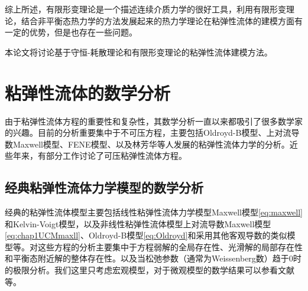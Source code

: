 综上所述，有限形变理论是一个描述连续介质力学的很好工具，利用有限形变理论，结合非平衡态热力学的方法发展起来的热力学理论在粘弹性流体的建模方面有一定的优势，但是也存在一些问题。

本论文将讨论基于守恒-耗散理论和有限形变理论的粘弹性流体建模方法。

\section{粘弹性流体的数学分析}
由于粘弹性流体方程的重要性和复杂性，其数学分析一直以来都吸引了很多数学家的兴趣\cite{lin2012some,li2007mathematical,weinan2002convergence,fabrizio1992mathematical,renardy2008mathematical,joseph1987hyperbolicity,guillope2010regular,saut2012lectures,yong2014newtonian,qian2010well,hu2011global,lei2005global,fang2014incompressible}。目前的分析重要集中于不可压方程，主要包括Oldroyd-B模型、上对流导数Maxwell模型、FENE模型、以及林芳华等人发展的粘弹性流体力学的分析\cite{elgindi2015global,saut2012lectures,renardy2000mathematical,masmoudi2011global,lions2000global,masmoudi2008well,lei2010remarks}。近些年来，有部分工作讨论了可压粘弹性流体方程\cite{fang2014incompressible,hu2012strong,qian2010global,qian2011initial}。
\subsection{经典粘弹性流体力学模型的数学分析}
经典的粘弹性流体模型主要包括线性粘弹性流体力学模型Maxwell模型\eqref{eq:maxwell}和Kelvin-Voigt模型，以及非线性粘弹性流体模型上对流导数Maxwell模型\eqref{eq:chap1UCMmaxll}、Oldroyd-B模型\eqref{eq:Oldroyd}和采用其他客观导数的类似模型等。对这些方程的分析主要集中于方程弱解的全局存在性、光滑解的局部存在性和平衡态附近解的整体存在性。以及当松弛参数（通常为Weissenberg数）趋于$0$时的极限分析。我们这里只考虑宏观模型，对于微观模型的数学结果可以参看文献\cite{masmoudi2013global,masmoudi2008well,li2007mathematical,li2004local,li2004well,lions2007global}等。

